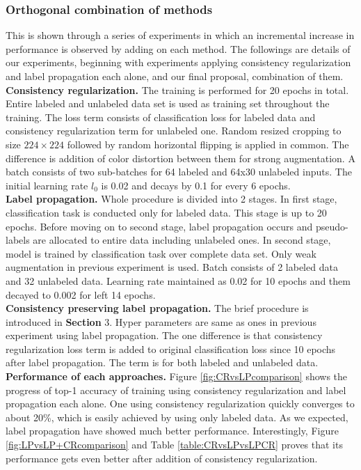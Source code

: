 \documentclass[10pt,twocolumn,letterpaper]{article}
\begin{document}
	
	
	\subsubsection{Orthogonal combination of methods}
	This is shown through a series of experiments in which an incremental increase in performance is observed by adding on each method. The followings are details of our experiments, beginning with experiments applying consistency regularization and label propagation each alone, and our final proposal, combination of them.\\
	\textbf{Consistency regularization.} The training is performed for 20 epochs in total. Entire labeled and unlabeled data set is used as training set throughout the training.  The loss term consists of classification loss for labeled data and consistency regularization term for unlabeled one. Random resized cropping to size $224\times224$ followed by random horizontal flipping is applied in common. The difference is addition of color distortion between them for strong augmentation. A batch consists of two sub-batches for 64 labeled and 64x30 unlabeled inputs. The initial learning rate $l_0$ is 0.02 and decays by 0.1 for every 6 epochs.\\
	\textbf{Label propagation.} Whole procedure is divided into 2 stages. In first stage, classification task is conducted only for labeled data. This stage is up to 20 epochs. Before moving on to second stage, label propagation occurs and pseudo-labels are allocated to entire data including unlabeled ones. In second stage, model is trained by classification task over complete data set. Only weak augmentation in previous experiment is used. Batch consists of 2 labeled data and 32 unlabeled data. Learning rate maintained as 0.02 for 10 epochs and them decayed to 0.002 for left 14 epochs.\\
	\textbf{Consistency preserving label propagation.} The brief procedure is introduced in \textbf{Section} 3. Hyper parameters are same as ones in previous experiment using label propagation. The one difference is that consistency regularization loss term is added to original classification loss since 10 epochs after label propagation. The term is for both labeled and unlabeled data.\\
	\textbf{Performance of each approaches.} Figure \ref{fig:CRvsLPcomparison} shows the progress of top-1 accuracy of training using consistency regularization and label propagation each alone. One using consistency regularization quickly converges to about 20\%, which is easily achieved by using only labeled data. As we expected, label propagation have showed much better performance. Interestingly, Figure \ref{fig:LPvsLP+CRcomparison} and Table \ref{table:CRvsLPvsLPCR} proves that its performance gets even better after addition of consistency regularization.
	
\end{document}
